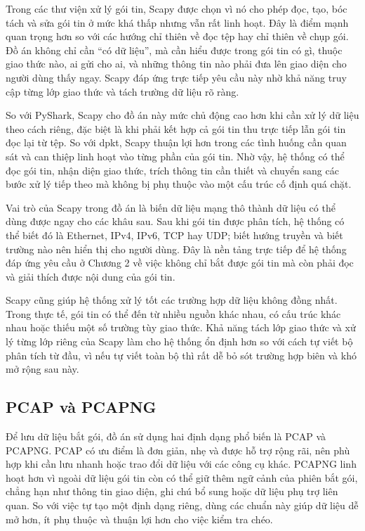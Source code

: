 \documentclass[../DoAn.tex]{subfiles}
\begin{document}
Trong các thư viện xử lý gói tin, Scapy được chọn vì nó cho phép đọc, tạo, bóc tách và sửa gói tin ở mức khá thấp nhưng vẫn rất linh hoạt. Đây là điểm mạnh quan trọng hơn so với các hướng chỉ thiên về đọc tệp hay chỉ thiên về chụp gói. Đồ án không chỉ cần “có dữ liệu”, mà cần hiểu được trong gói tin có gì, thuộc giao thức nào, ai gửi cho ai, và những thông tin nào phải đưa lên giao diện cho người dùng thấy ngay. Scapy đáp ứng trực tiếp yêu cầu này nhờ khả năng truy cập từng lớp giao thức và tách trường dữ liệu rõ ràng.

So với PyShark, Scapy cho đồ án này mức chủ động cao hơn khi cần xử lý dữ liệu theo cách riêng, đặc biệt là khi phải kết hợp cả gói tin thu trực tiếp lẫn gói tin đọc lại từ tệp. So với dpkt, Scapy thuận lợi hơn trong các tình huống cần quan sát và can thiệp linh hoạt vào từng phần của gói tin. Nhờ vậy, hệ thống có thể đọc gói tin, nhận diện giao thức, trích thông tin cần thiết và chuyển sang các bước xử lý tiếp theo mà không bị phụ thuộc vào một cấu trúc cố định quá chặt.

Vai trò của Scapy trong đồ án là biến dữ liệu mạng thô thành dữ liệu có thể dùng được ngay cho các khâu sau. Sau khi gói tin được phân tích, hệ thống có thể biết đó là Ethernet, IPv4, IPv6, TCP hay UDP; biết hướng truyền và biết trường nào nên hiển thị cho người dùng. Đây là nền tảng trực tiếp để hệ thống đáp ứng yêu cầu ở Chương 2 về việc không chỉ bắt được gói tin mà còn phải đọc và giải thích được nội dung của gói tin.

Scapy cũng giúp hệ thống xử lý tốt các trường hợp dữ liệu không đồng nhất. Trong thực tế, gói tin có thể đến từ nhiều nguồn khác nhau, có cấu trúc khác nhau hoặc thiếu một số trường tùy giao thức. Khả năng tách lớp giao thức và xử lý từng lớp riêng của Scapy làm cho hệ thống ổn định hơn so với cách tự viết bộ phân tích từ đầu, vì nếu tự viết toàn bộ thì rất dễ bỏ sót trường hợp biên và khó mở rộng sau này.

\subsection{PCAP và PCAPNG}
Để lưu dữ liệu bắt gói, đồ án sử dụng hai định dạng phổ biến là PCAP và PCAPNG. PCAP có ưu điểm là đơn giản, nhẹ và được hỗ trợ rộng rãi, nên phù hợp khi cần lưu nhanh hoặc trao đổi dữ liệu với các công cụ khác. PCAPNG linh hoạt hơn vì ngoài dữ liệu gói tin còn có thể giữ thêm ngữ cảnh của phiên bắt gói, chẳng hạn như thông tin giao diện, ghi chú bổ sung hoặc dữ liệu phụ trợ liên quan. So với việc tự tạo một định dạng riêng, dùng các chuẩn này giúp dữ liệu dễ mở hơn, ít phụ thuộc và thuận lợi hơn cho việc kiểm tra chéo.
\end{document}
